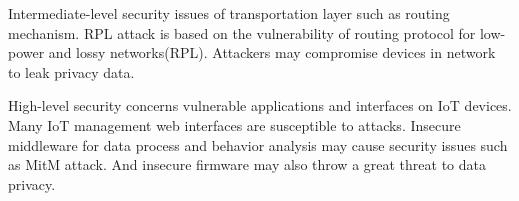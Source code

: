 Intermediate-level security issues of transportation layer such as routing mechanism. RPL attack is based on the vulnerability of routing protocol for low-power and lossy networks(RPL)\cite{dvir2011vera}. Attackers may compromise devices in network to leak privacy data.

High-level security concerns vulnerable applications and interfaces on IoT devices. Many IoT management web interfaces are susceptible to attacks\cite{owasp2016url}. Insecure middleware for data process and behavior analysis may cause security issues such as MitM attack\cite{conzon2012virtus,levy2015ownership}. And insecure firmware may also throw a great threat to data privacy\cite{owasp2016url}.


